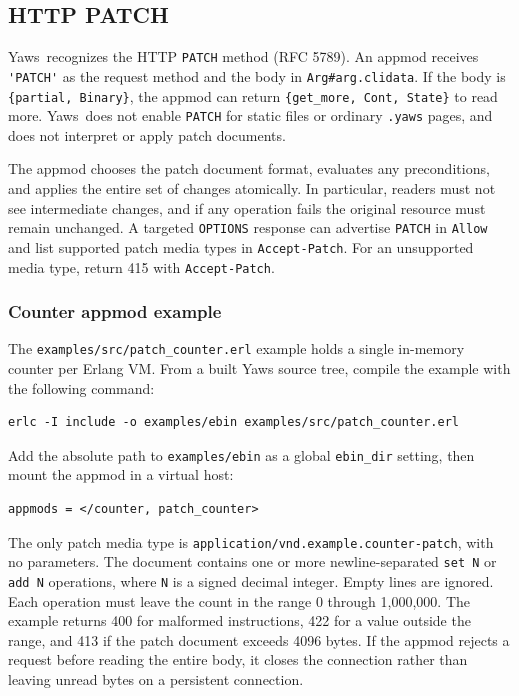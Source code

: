 \documentclass[11pt,oneside,english]{book}
\newcommand{\Yaws}            %
        {{\sc Yaws}}
\begin{document}
\subsection{HTTP PATCH}

\Yaws\ recognizes the HTTP \verb+PATCH+ method (RFC 5789). An appmod
receives \verb+'PATCH'+ as the request method and the body in
\verb+Arg#arg.clidata+. If the body is \verb+{partial, Binary}+, the
appmod can return \verb+{get_more, Cont, State}+ to read more. \Yaws\
does not enable \verb+PATCH+ for static files or ordinary \verb+.yaws+
pages, and does not interpret or apply patch documents.

The appmod chooses the patch document format, evaluates any
preconditions, and applies the entire set of changes atomically. In
particular, readers must not see intermediate changes, and if any
operation fails the original resource must remain unchanged. A targeted
\verb+OPTIONS+ response can advertise \verb+PATCH+ in \verb+Allow+
and list supported patch media types in \verb+Accept-Patch+. For an
unsupported media type, return 415 with \verb+Accept-Patch+.

\subsubsection{Counter appmod example}

The \verb+examples/src/patch_counter.erl+ example holds a single
in-memory counter per Erlang VM. From a built Yaws source tree, compile
the example with the following command:

\begin{verbatim}
erlc -I include -o examples/ebin examples/src/patch_counter.erl
\end{verbatim}

Add the absolute path to \verb+examples/ebin+ as a global
\verb+ebin_dir+ setting, then mount the appmod in a virtual host:

\begin{verbatim}
appmods = </counter, patch_counter>
\end{verbatim}

The only patch media type is
\verb+application/vnd.example.counter-patch+, with no parameters. The
document contains one or more newline-separated \verb+set N+ or
\verb+add N+ operations, where \verb+N+ is a signed decimal integer.
Empty lines are ignored. Each operation must leave the count in the
range 0 through 1,000,000. The example returns 400 for malformed
instructions, 422 for a value outside the range, and 413 if the patch
document exceeds 4096 bytes. If the appmod rejects a request before
reading the entire body, it closes the connection rather than leaving
unread bytes on a persistent connection.
\end{document}
